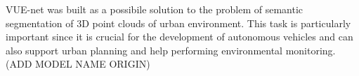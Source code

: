 VUE-net was built as a possibile solution to the problem of semantic segmentation of 
3D point clouds of urban environment.
This task is particularly important since it is crucial for the development of autonomous 
vehicles and can also support urban planning and help performing environmental monitoring.
(ADD MODEL NAME ORIGIN)
